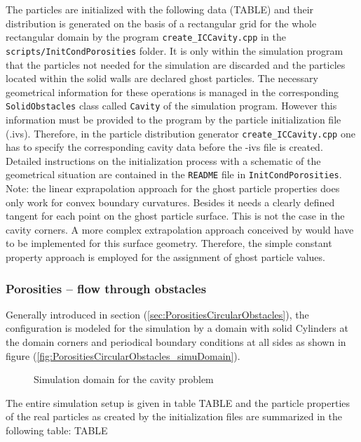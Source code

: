\documentclass{report}
\begin{document}
The particles are initialized with the following data (TABLE) and their distribution is generated on the basis of a rectangular grid for the whole rectangular domain by the program {\tt create\_ICCavity.cpp} in the {\tt scripts/InitCondPorosities} folder. It is only within the simulation program that the particles not needed for the simulation are discarded and the particles located within the solid walls are declared ghost particles. The necessary geometrical information for these operations is managed in the corresponding {\tt SolidObstacles} class called {\tt Cavity} of the simulation program.
However this information must be provided to the program by the particle initialization file (.ivs). Therefore, in the particle distribution generator {\tt create\_ICCavity.cpp} one has to specify the corresponding cavity data before the -ivs file is created. Detailed instructions on the initialization process with a schematic of the geometrical situation are contained in the {\tt README} file in {\tt InitCondPorosities}.
Note: the linear exprapolation approach for the ghost particle properties does only work for convex boundary curvatures. Besides it needs a clearly defined tangent for each point on the ghost particle surface. This is not the case in the cavity corners.
A more complex extrapolation approach conceived by \cite{Yildiz2009} would have to be implemented for this surface geometry. Therefore, the simple constant property approach is employed for the assignment of ghost particle values.
 



\subsubsection{Porosities -- flow through obstacles}
\label{sec:SimuSetup_flowThroughObstacles}

Generally introduced in section (\ref{sec:PorositiesCircularObstacles}), the configuration is modeled for the simulation by a domain with solid Cylinders at the domain corners and periodical boundary conditions at all sides as shown in figure (\ref{fig:PorositiesCircularObstacles_simuDomain}). 

\begin{figure}[!htbp]
  \centering
  \caption{Simulation domain for the cavity problem }
  \label{fig:PorositiesCavitiesSimuDomain}
\end{figure}

 The entire simulation setup is given in table TABLE and the particle properties of the real particles as created by the initialization files are summarized in the following table:
\linebreak[2]
TABLE
\linebreak[2]
\end{document}
